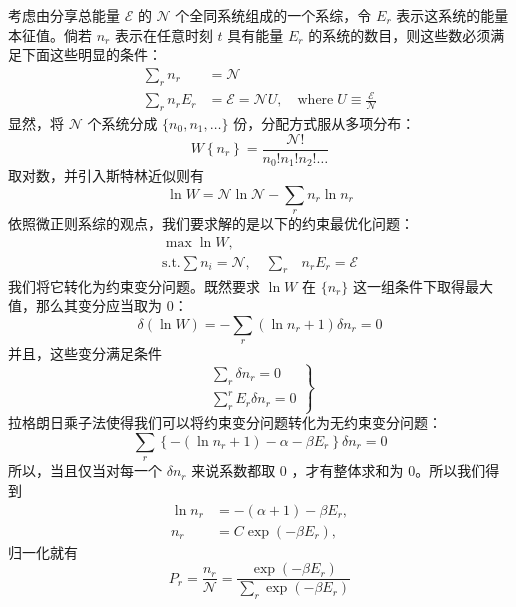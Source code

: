 \documentclass[hyperref,UTF-8]{ctexart}
\newcommand{\0}{\boldsymbol{0}}
\begin{document}
考虑由分享总能量 $\mathcal{E}$ 的 $\mathcal{N}$ 个全同系统组成的一个系综，令 $E_r$ 表示这系统的能量本征值。倘若 $n_r$ 表示在任意时刻 $t$ 具有能量 $E_r$ 的系统的数目，则这些数必须满足下面这些明显的条件：
\begin{align}
    \sum_r n_r&=\mathcal{N} \\
    \sum_r n_r E_r&=\mathcal{E}=\mathcal{N} U, \quad\text{where}\; U \equiv \frac{\mathcal{E}}{\mathcal{N}}  
\end{align}
显然，将 $\mathcal{N}$ 个系统分成 $\{n_0,n_1,\dots\}$ 份，分配方式服从多项分布：
\begin{equation}
    W\left\{n_r\right\}=\frac{\mathcal{N} !}{n_{0} ! n_{1} ! n_{2} ! \ldots}
\end{equation}
取对数，并引入斯特林近似则有
\begin{equation}
    \ln W=\mathcal{N} \ln \mathcal{N}-\sum_r n_r \ln n_r
\end{equation}
依照微正则系综的观点，我们要求解的是以下的约束最优化问题：
\begin{equation}\label{equ:optimizeIII}
    \begin{split}
        \max \ln W,&\\
        \text{s.t.}\sum n_i = \mathcal{N},\quad\sum_r &n_r E_r=\mathcal{E}
    \end{split}
\end{equation}
我们将它转化为约束变分问题。既然要求 $\ln W$ 在 $\{n_r\}$ 这一组条件下取得最大值，那么其变分应当取为 $0$：
\[
    \delta(\ln W)=-\sum_r\left(\ln n_r+1\right) \delta n_r = 0
\]
并且，这些变分满足条件
\[
    \left.\begin{array}{l}
        \sum_r \delta n_r=0 \\
        \sum_r^r E_r \delta n_r=0
        \end{array}\right\}
\]
拉格朗日乘子法使得我们可以将约束变分问题转化为无约束变分问题：
\begin{equation}\label{equ:variational}
    \sum_r\left\{-\left(\ln n_r+1\right)-\alpha-\beta E_r\right\} \delta n_r=0
\end{equation}
所以，当且仅当对每一个 $\delta n_r$ 来说系数都取 $0$ ，才有整体求和为 $0$。所以我们得到
\begin{equation}
        \begin{aligned}
            \ln n_r&=-(\alpha+1)-\beta E_r,\\
            n_r&=C \exp \left(-\beta E_r\right),
            \end{aligned}
\end{equation}
归一化就有
\begin{equation}\label{equ:canonicalprobability}
    P_r = \frac{n_r}{\mathcal{N}}=\frac{\exp \left(-\beta E_r\right)}{\sum_r \exp \left(-\beta E_r\right)}
\end{equation}
\end{document}
